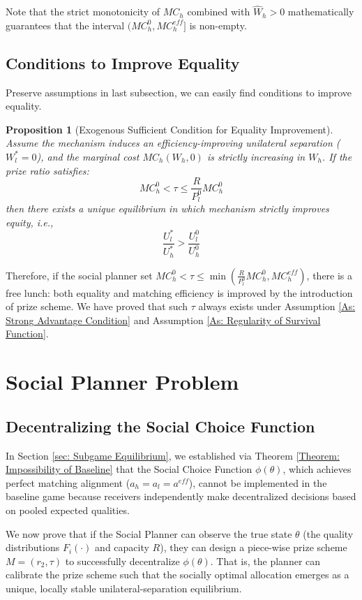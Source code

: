 \documentclass[12pt, a4paper]{article}
\newtheorem{proposition}{Proposition}
\begin{document}
Note that the strict monotonicity of $MC_h$ combined with $\hat{W}_h > 0$ mathematically guarantees that the interval $(MC_h^0, MC_h^{eff}]$ is non-empty.


\subsection{Conditions to Improve Equality}

Preserve assumptions in last subsection, we can easily find conditions to improve equality.

\begin{proposition}[Exogenous Sufficient Condition for Equality Improvement]
\label{prop:SC_equality}
Assume the mechanism induces an efficiency-improving unilateral separation ($W_l^*=0$), and the marginal cost $MC_h(W_h,0)$ is strictly increasing in $W_h$. If the prize ratio satisfies:
\[
MC_h^0 < \tau \le \frac{R}{P_l^0} MC_h^0
\]
then there exists a unique equilibrium in which mechanism strictly improves equity, i.e.,
\[
\frac{U_l^*}{U_h^*} > \frac{U_l^0}{U_h^0}
\]
\end{proposition}

Therefore, if the social planner set $MC_h^0 < \tau \le \min(\frac{R}{P_l^0} MC_h^0,MC_h^{eff})$, there is a free lunch: both equality and matching efficiency is improved by the introduction of prize scheme. We have proved that such $\tau$ always exists under Assumption \ref{As: Strong Advantage Condition} and Assumption \ref{As: Regularity of Survival Function}.


\section{Social Planner Problem}

\subsection{Decentralizing the Social Choice Function}

In Section \ref{sec: Subgame Equilibrium}, we established via Theorem \ref{Theorem: Impossibility of Baseline} that the Social Choice Function $\phi (\theta)$, which achieves perfect matching alignment ($a_h = a_l = a^{eff}$), cannot be implemented in the baseline game because receivers independently make decentralized decisions based on pooled expected qualities.

We now prove that if the Social Planner can observe the true state $\theta$ (the quality distributions $F_i(\cdot)$ and capacity $R$), they can design a piece-wise prize scheme $M = (r_2, \tau)$ to successfully decentralize $\phi (\theta)$. That is, the planner can calibrate the prize scheme such that the socially optimal allocation emerges as a unique, locally stable unilateral-separation equilibrium.
\end{document}
